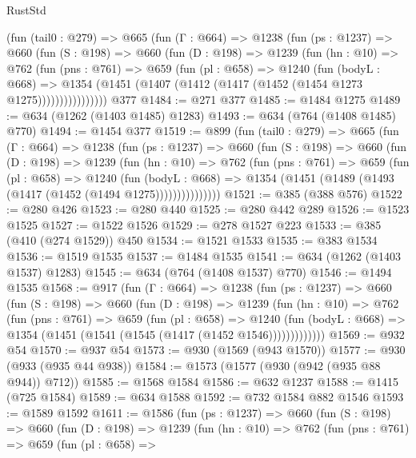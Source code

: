 \begin{lexlean}{RustStd}
\begin{coremodule}
{\begin{coremodule}
{{{{{{{{      (fun (tail0 : @279) =>
      @665
        (fun (Γ : @664) =>
        @1238
          (fun (ps : @1237) =>
          @660
            (fun (S : @198) =>
            @660
              (fun (D : @198) =>
              @1239
                (fun (hn : @10) =>
                @762
                  (fun (pns : @761) =>
                  @659
                    (fun (pl : @658) =>
                    @1240
                      (fun (bodyL : @668) =>
                      @1354 (@1451 (@1407 (@1412 (@1417 (@1452 (@1454 @1273 @1275))))))))))))))))
    @377
@1484 := @271 @377
@1485 := @1484 @1275
@1489 := @634 (@1262 (@1403 @1485) @1283)
@1493 := @634 (@764 (@1408 @1485) @770)
@1494 := @1454 @377
@1519 := @899
    (fun (tail0 : @279) =>
    @665
      (fun (Γ : @664) =>
      @1238
        (fun (ps : @1237) =>
        @660
          (fun (S : @198) =>
          @660
            (fun (D : @198) =>
            @1239
              (fun (hn : @10) =>
              @762
                (fun (pns : @761) =>
                @659
                  (fun (pl : @658) =>
                  @1240
                    (fun (bodyL : @668) =>
                    @1354 (@1451 (@1489 (@1493 (@1417 (@1452 (@1494 @1275)))))))))))))))
@1521 := @385 (@388 @576)
@1522 := @280 @426
@1523 := @280 @440
@1525 := @280 @442 @289
@1526 := @1523 @1525
@1527 := @1522 @1526
@1529 := @278 @1527 @223
@1533 := @385 (@410 (@274 @1529)) @450
@1534 := @1521 @1533
@1535 := @383 @1534
@1536 := @1519 @1535
@1537 := @1484 @1535
@1541 := @634 (@1262 (@1403 @1537) @1283)
@1545 := @634 (@764 (@1408 @1537) @770)
@1546 := @1494 @1535
@1568 := @917
    (fun (Γ : @664) =>
    @1238
      (fun (ps : @1237) =>
      @660
        (fun (S : @198) =>
        @660
          (fun (D : @198) =>
          @1239
            (fun (hn : @10) =>
            @762
              (fun (pns : @761) =>
              @659
                (fun (pl : @658) =>
                @1240
                  (fun (bodyL : @668) => @1354 (@1451 (@1541 (@1545 (@1417 (@1452 @1546)))))))))))))
@1569 := @932 @54
@1570 := @937 @54
@1573 := @930 (@1569 (@943 @1570))
@1577 := @930 (@933 (@935 @44 @938))
@1584 := @1573 (@1577 (@930 (@942 (@935 @88 @944)) @712))
@1585 := @1568 @1584
@1586 := @632 @1237
@1588 := @1415 (@725 @1584)
@1589 := @634 @1588
@1592 := @732 @1584 @882 @1546
@1593 := @1589 @1592
@1611 := @1586
    (fun (ps : @1237) =>
    @660
      (fun (S : @198) =>
      @660
        (fun (D : @198) =>
        @1239
          (fun (hn : @10) =>
          @762
            (fun (pns : @761) =>
            @659
              (fun (pl : @658) =>
}}}}}}}}
\end{coremodule}}
\end{coremodule}
\end{lexlean}
